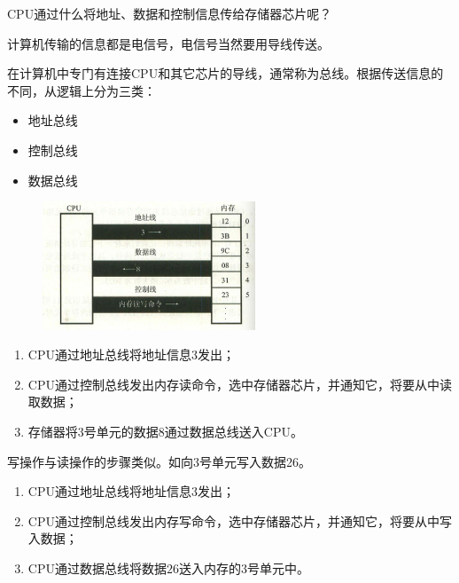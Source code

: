 % 
\begin{frame}
  \begin{question}{}
    CPU通过什么将地址、数据和控制信息传给存储器芯片呢？
  \end{question} \pause 
  
  计算机传输的信息都是电信号，电信号当然要用导线传送。

  \begin{defn}[总线]{}
    在计算机中专门有连接CPU和其它芯片的导线，通常称为总线。根据传送信息的不同，从逻辑上分为三类： 

    \begin{itemize}
    \item 地址总线 
    \item 控制总线 
    \item 数据总线
    \end{itemize}
  \end{defn}
\end{frame}
% 
\begin{frame}
  \begin{exam}[]{}
    \begin{figure}
      \centering
      \includegraphics[width=2.5in]{slide01/images/cpu_read}
    \end{figure}
    \begin{enumerate}
    \item CPU通过地址总线将地址信息$3$发出；
    \item CPU通过控制总线发出内存读命令，选中存储器芯片，并通知它，将要从中读取数据；
    \item 存储器将$3$号单元的数据$8$通过数据总线送入CPU。
    \end{enumerate}
  \end{exam}
\end{frame}
% 
\begin{frame}
  写操作与读操作的步骤类似。如向$3$号单元写入数据26。\vspace{0.1in}

  \begin{enumerate}
  \item CPU通过地址总线将地址信息$3$发出；
  \item CPU通过控制总线发出内存写命令，选中存储器芯片，并通知它，将要从中写入数据；
  \item CPU通过数据总线将数据$26$送入内存的$3$号单元中。
  \end{enumerate}
\end{frame}
